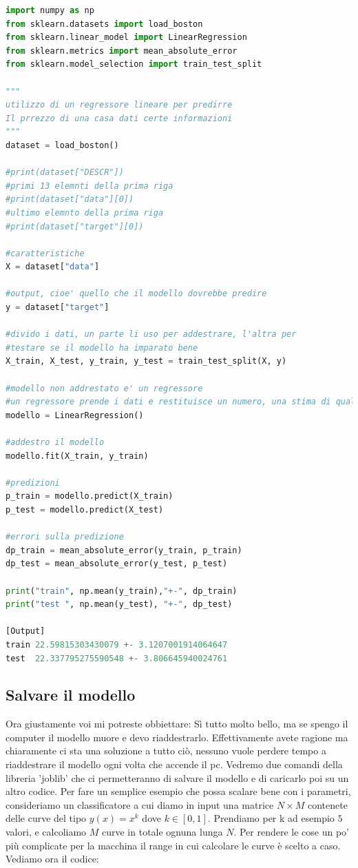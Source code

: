 \documentclass[10pt,a4paper]{article}
\begin{document}
\begin{lstlisting}[language=Python]
import numpy as np
from sklearn.datasets import load_boston
from sklearn.linear_model import LinearRegression
from sklearn.metrics import mean_absolute_error
from sklearn.model_selection import train_test_split

"""
utilizzo di un regressore lineare per predirre
Il prrezzo di una casa dati certe informazioni
"""
dataset = load_boston()

#print(dataset["DESCR"])
#primi 13 elemnti della prima riga
#print(dataset["data"][0])
#ultimo elemnto della prima riga
#print(dataset["target"][0])

#caratteristiche
X = dataset["data"]

#output, cioe' quello che il modello dovrebbe predire
y = dataset["target"]

#divido i dati, un parte li uso per addestrare, l'altra per
#testare se il modello ha imparato bene
X_train, X_test, y_train, y_test = train_test_split(X, y)

#modello non addrestato e' un regressore
#un regressore prende i dati e restituisce un numero, una stima di qualcosa
modello = LinearRegression()

#addestro il modello
modello.fit(X_train, y_train)

#predizioni
p_train = modello.predict(X_train)
p_test = modello.predict(X_test)

#errori sulla predizione
dp_train = mean_absolute_error(y_train, p_train)
dp_test = mean_absolute_error(y_test, p_test)

print("train", np.mean(y_train),"+-", dp_train)
print("test ", np.mean(y_test), "+-", dp_test)

[Output]
train 22.59815303430079 +- 3.1207001914064647
test  22.337795275590548 +- 3.806645940024761
\end{lstlisting}

\subsection{Salvare il modello}

Ora giustamente voi mi potreste obbiettare: Sì tutto molto bello, ma se spengo il computer il modello muore e devo riaddestrarlo. Effettivamente avete ragione ma chiaramente ci sta una soluzione a tutto ciò, nessuno vuole perdere tempo a riaddestrare il modello ogni volta che accende il pc. Vedremo due comandi della libreria 'joblib' che ci permetteranno di salvare il modello e di caricarlo poi su un altro codice. Per fare un semplice esempio che possa scalare bene con i parametri, consideriamo un classificatore a cui diamo in input una matrice $N \times M$ contenete delle curve del tipo $y(x) = x^k$ dove $k \in [0, 1]$. Prendiamo per k ad esempio $5$ valori, e calcoliamo $M$ curve in totale ognuna lunga $N$. Per rendere le cose un po' più complicate per la macchina il range in cui calcolare le curve è scelto a caso. Vediamo ora il codice:
\end{document}
